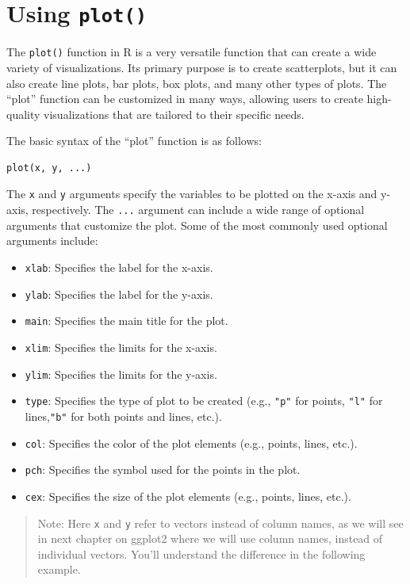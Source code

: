 \documentclass[
]{book}
\providecommand{\tightlist}{%
  \setlength{\itemsep}{0pt}\setlength{\parskip}{0pt}}
\begin{document}
\hypertarget{using-plot}{%
\section{\texorpdfstring{Using \texttt{plot()}}{Using plot()}}\label{using-plot}}

The \texttt{plot()} function in R is a very versatile function that can create a wide variety of visualizations. Its primary purpose is to create scatterplots, but it can also create line plots, bar plots, box plots, and many other types of plots. The ``plot'' function can be customized in many ways, allowing users to create high-quality visualizations that are tailored to their specific needs.

The basic syntax of the ``plot'' function is as follows:

\begin{verbatim}
plot(x, y, ...)
\end{verbatim}

The \texttt{x} and \texttt{y} arguments specify the variables to be plotted on the x-axis and y-axis, respectively. The \texttt{...} argument can include a wide range of optional arguments that customize the plot. Some of the most commonly used optional arguments include:

\begin{itemize}
\tightlist
\item
  \texttt{xlab}: Specifies the label for the x-axis.
\item
  \texttt{ylab}: Specifies the label for the y-axis.
\item
  \texttt{main}: Specifies the main title for the plot.
\item
  \texttt{xlim}: Specifies the limits for the x-axis.
\item
  \texttt{ylim}: Specifies the limits for the y-axis.
\item
  \texttt{type}: Specifies the type of plot to be created (e.g., \texttt{"p"} for points, \texttt{"l"} for lines,\texttt{"b"} for both points and lines, etc.).
\item
  \texttt{col}: Specifies the color of the plot elements (e.g., points, lines, etc.).
\item
  \texttt{pch}: Specifies the symbol used for the points in the plot.
\item
  \texttt{cex}: Specifies the size of the plot elements (e.g., points, lines, etc.).
\end{itemize}

\begin{quote}
Note: Here \texttt{x} and \texttt{y} refer to vectors instead of column names, as we will see in next chapter on ggplot2 where we will use column names, instead of individual vectors. You'll understand the difference in the following example.
\end{quote}
\end{document}

